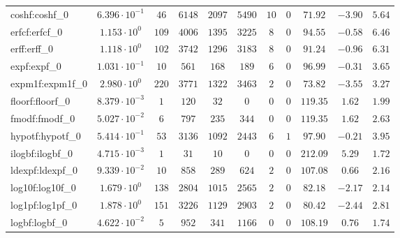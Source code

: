 \begin{tabular}{|l|c|c|c|c|c|c|c|c|c|c|}
coshf:coshf\_0               & $ 6.396 \cdot 10^{-1} $ & $ 46     $ & $ 6148   $ & $ 2097  $ & $ 5490  $ & $ 10  $ & $ 0 $ & $ 71.92       $ & $ -3.90   $ & $ 5.64    $ \\
erfcf:erfcf\_0               & $ 1.153 \cdot 10^{0}  $ & $ 109    $ & $ 4006   $ & $ 1395  $ & $ 3225  $ & $ 8   $ & $ 0 $ & $ 94.55       $ & $ -0.58   $ & $ 6.46    $ \\
erff:erff\_0                 & $ 1.118 \cdot 10^{0}  $ & $ 102    $ & $ 3742   $ & $ 1296  $ & $ 3183  $ & $ 8   $ & $ 0 $ & $ 91.24       $ & $ -0.96   $ & $ 6.31    $ \\
expf:expf\_0                 & $ 1.031 \cdot 10^{-1} $ & $ 10     $ & $ 561    $ & $ 168   $ & $ 189   $ & $ 6   $ & $ 0 $ & $ 96.99       $ & $ -0.31   $ & $ 3.65    $ \\
expm1f:expm1f\_0             & $ 2.980 \cdot 10^{0}  $ & $ 220    $ & $ 3771   $ & $ 1322  $ & $ 3463  $ & $ 2   $ & $ 0 $ & $ 73.82       $ & $ -3.55   $ & $ 3.27    $ \\
floorf:floorf\_0             & $ 8.379 \cdot 10^{-3} $ & $ 1      $ & $ 120    $ & $ 32    $ & $ 0     $ & $ 0   $ & $ 0 $ & $ 119.35      $ & $ 1.62    $ & $ 1.99    $ \\
fmodf:fmodf\_0               & $ 5.027 \cdot 10^{-2} $ & $ 6      $ & $ 797    $ & $ 235   $ & $ 344   $ & $ 0   $ & $ 0 $ & $ 119.35      $ & $ 1.62    $ & $ 2.63    $ \\
hypotf:hypotf\_0             & $ 5.414 \cdot 10^{-1} $ & $ 53     $ & $ 3136   $ & $ 1092  $ & $ 2443  $ & $ 6   $ & $ 1 $ & $ 97.90       $ & $ -0.21   $ & $ 3.95    $ \\
ilogbf:ilogbf\_0             & $ 4.715 \cdot 10^{-3} $ & $ 1      $ & $ 31     $ & $ 10    $ & $ 0     $ & $ 0   $ & $ 0 $ & $ 212.09      $ & $ 5.29    $ & $ 1.72    $ \\
ldexpf:ldexpf\_0             & $ 9.339 \cdot 10^{-2} $ & $ 10     $ & $ 858    $ & $ 289   $ & $ 624   $ & $ 2   $ & $ 0 $ & $ 107.08      $ & $ 0.66    $ & $ 2.16    $ \\
log10f:log10f\_0             & $ 1.679 \cdot 10^{0}  $ & $ 138    $ & $ 2804   $ & $ 1015  $ & $ 2565  $ & $ 2   $ & $ 0 $ & $ 82.18       $ & $ -2.17   $ & $ 2.14    $ \\
log1pf:log1pf\_0             & $ 1.878 \cdot 10^{0}  $ & $ 151    $ & $ 3226   $ & $ 1129  $ & $ 2903  $ & $ 2   $ & $ 0 $ & $ 80.42       $ & $ -2.44   $ & $ 2.81    $ \\
logbf:logbf\_0               & $ 4.622 \cdot 10^{-2} $ & $ 5      $ & $ 952    $ & $ 341   $ & $ 1166  $ & $ 0   $ & $ 0 $ & $ 108.19      $ & $ 0.76    $ & $ 1.74    $ \\

\end{tabular}
